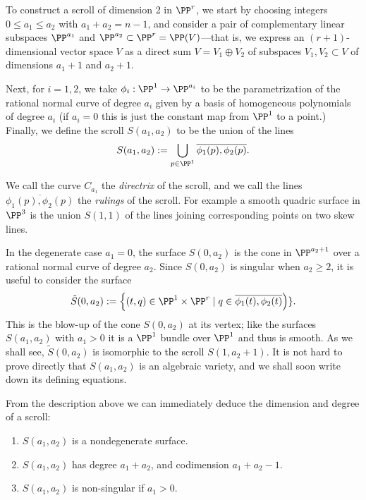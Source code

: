 To construct a scroll of dimension 2 in $\PP^r$, we start by choosing integers $0\leq a_1 \leq a_2$ with $a_1 + a_2 = n-1$, and consider  a pair of complementary linear subspaces $\PP^{a_1}$ and $\PP^{a_2} \subset \PP^r = \PP(V)$---that is, we express an $(r+1)$-dimensional vector space $V$ as a direct sum $V =  V_1 \oplus V_2$ of subspaces $V_1, V_2 \subset V$ of dimensions $a_1+1$ and $a_2+1$.

Next, for $i=1,2$, we take $\phi_i : \PP^1 \to \PP^{a_i}$ to be the parametrization of the rational normal curve of degree $a_i$ given by a basis of homogeneous polynomials of degree $a_i$ (if $a_i = 0$ this is just the constant map from $\PP^1$ to a point.) Finally, we define the scroll $S(a_1, a_2)$ to be the union of the lines
$$
S(a_1,a_2) := \bigcup_{p\in \PP^1} \overline{\phi_1(p), \phi_2(p)}.
$$

We call the curve $C_{a_{1}}$ the \emph{directrix} of the scroll, and we call the lines $ \overline{\phi_1(p), \phi_2(p)}$ the \emph{rulings} of the scroll. For example a smooth quadric surface in $\PP^3$ is the union $S(1,1)$ of the lines joining corresponding points on two skew lines. 


In the degenerate case $a_{1}= 0$, the surface $S(0,a_{2})$ is the cone
in $\PP^{a_{2}+1}$ over a rational normal curve of degree $a_{2}$. Since $S(0,a_2)$ is singular when $a_2\geq 2$, it is useful to consider the surface
$$
\tilde S(0, a_2) := \left\{ (t, q) \in \PP^1 \times \PP^r  \mid q \in \overline{\phi_1(t), \phi_2(t)}\right)\}.
$$
This is the blow-up of the cone $S(0, a_2)$ at its vertex; like the surfaces $S(a_1,a_2)$ with $a_1 > 0$ it is a $\PP^1$ bundle over $\PP^1$ and thus is smooth. As we shall see, $\tilde S(0, a_2)$ is isomorphic to the scroll $S(1, a_2+1)$.
It is not hard to prove directly that $S(a_1,a_2)$ is an algebraic variety, and we shall soon write down its defining equations.

From the description above we can immediately deduce the dimension and degree of a scroll:

\begin{proposition}
\begin{enumerate}
\item $S(a_1,a_2)$ is a nondegenerate surface.
 \item $S(a_1,a_2)$ has degree $a_1+a_2$, and codimension $a_1+a_2-1.$
 \item $S(a_{1},a_{2})$ is non-singular if $a_{1}>0$.
 \end{enumerate}
\end{proposition}\label{deg and codim}

